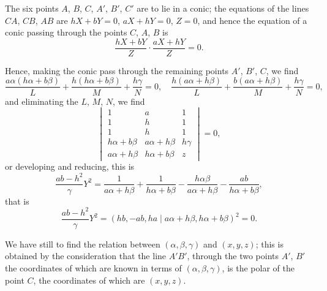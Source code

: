 \documentclass[11pt,a4paper]{article}
\theoremstyle{plain}
\begin{document}
The six points $A$, $B$, $C$, $A'$, $B'$, $C'$ are to lie in a conic; the equations of the lines $CA$, $CB$, $AB$ are $hX + bY = 0$, $aX + hY = 0$, $Z = 0$, and hence the equation of a conic passing through the points $C$, $A$, $B$ is
\begin{equation}
\frac{hX + bY}{Z} \cdot \frac{aX + hY}{Z} = 0.
\end{equation}

\newpage
\setcounter{equation}{17}

Hence, making the conic pass through the remaining points $A'$, $B'$, $C$, we find
\begin{equation}
\frac{a\alpha(h\alpha + b\beta)}{L} + \frac{h(h\alpha + b\beta)}{M} + \frac{h\gamma}{N} = 0, \quad \frac{h(a\alpha + h\beta)}{L} + \frac{b(a\alpha + h\beta)}{M} + \frac{h\gamma}{N} = 0,
\end{equation}
and eliminating the $L$, $M$, $N$, we find
\begin{equation}
\begin{vmatrix}
1 & a & 1 \\
1 & h & 1 \\
1 & h & 1 \\
h\alpha + b\beta & a\alpha + h\beta & h\gamma \\
a\alpha + h\beta & h\alpha + b\beta & z
\end{vmatrix} = 0,
\end{equation}
or developing and reducing, this is
\begin{equation}
\frac{ab-h^2}{\gamma}Y^2 = \frac{1}{a\alpha + h\beta} + \frac{1}{h\alpha + b\beta} - \frac{h\alpha\beta}{a\alpha + h\beta} - \frac{ab}{h\alpha + b\beta},
\end{equation}
that is
\begin{equation}
\frac{ab-h^2}{\gamma}Y^2 = (hb, -ab, ha \mid a\alpha + h\beta, h\alpha + b\beta)^2 = 0.
\end{equation}

We have still to find the relation between $(\alpha, \beta, \gamma)$ and $(x, y, z)$; this is obtained by the consideration that the line $A'B'$, through the two points $A'$, $B'$ the coordinates of which are known in terms of $(\alpha, \beta, \gamma)$, is the polar of the point $C$, the coordinates of which are $(x, y, z)$.
\end{document}
